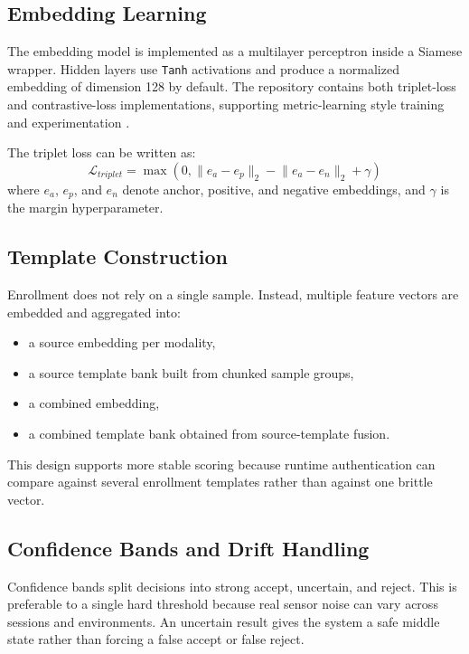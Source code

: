 \documentclass[12pt]{report}
\begin{document}
\subsection{Embedding Learning}
The embedding model is implemented as a multilayer perceptron inside a Siamese wrapper. Hidden layers use \texttt{Tanh} activations and produce a normalized embedding of dimension 128 by default. The repository contains both triplet-loss and contrastive-loss implementations, supporting metric-learning style training and experimentation \cite{hadsell2006dimensionality, schroff2015facenet}.

The triplet loss can be written as:
\begin{equation}
\mathcal{L}_{triplet} = \max \left(0, \lVert e_a - e_p \rVert_2 - \lVert e_a - e_n \rVert_2 + \gamma \right)
\end{equation}
where $e_a$, $e_p$, and $e_n$ denote anchor, positive, and negative embeddings, and $\gamma$ is the margin hyperparameter.

\subsection{Template Construction}
Enrollment does not rely on a single sample. Instead, multiple feature vectors are embedded and aggregated into:
\begin{itemize}[leftmargin=1.2cm]
\item a source embedding per modality,
\item a source template bank built from chunked sample groups,
\item a combined embedding,
\item a combined template bank obtained from source-template fusion.
\end{itemize}

This design supports more stable scoring because runtime authentication can compare against several enrollment templates rather than against one brittle vector.

\subsection{Confidence Bands and Drift Handling}
Confidence bands split decisions into strong accept, uncertain, and reject. This is preferable to a single hard threshold because real sensor noise can vary across sessions and environments. An uncertain result gives the system a safe middle state rather than forcing a false accept or false reject.
\end{document}
